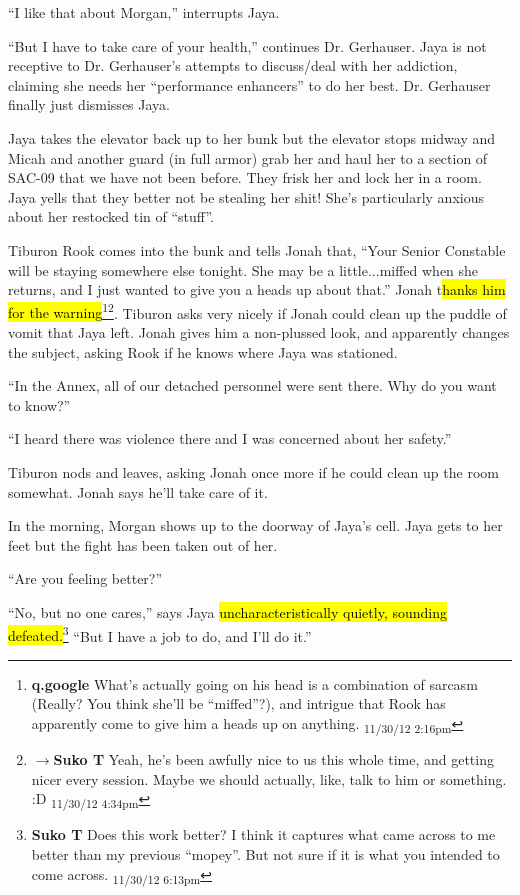 ``I like that about Morgan,'' interrupts Jaya.

``But I have to take care of your health,'' continues Dr. Gerhauser.  Jaya is not receptive to Dr. Gerhauser's attempts to discuss/deal with her addiction, claiming she needs her ``performance enhancers'' to do her best.  Dr. Gerhauser finally just dismisses Jaya. 



Jaya takes the elevator back up to her bunk but the elevator stops midway and Micah and another guard (in full armor) grab her and haul her to a section of SAC-09 that we have not been before. They frisk her and lock her in a room.  Jaya yells that they better not be stealing her shit!  She's particularly anxious about her restocked tin of ``stuff''.



Tiburon Rook comes into the bunk and tells Jonah that, ``Your Senior Constable will be staying somewhere else tonight.  She may be a little...miffed when she returns, and I just wanted to give you a heads up about that.'' Jonah t\hl{hanks him for the warning}\footnote{\textbf{q.google }What's actually going on his head is a combination of sarcasm (Really?  You think she'll be ``miffed''?), and intrigue that Rook has apparently come to give him a heads up on anything. \textsubscript{11/30/12 2:16pm}}\footnote{$\rightarrow$\textbf{Suko T }Yeah, he's been awfully nice to us this whole time, and getting nicer every session.  Maybe we should actually, like, talk to him or something. :D \textsubscript{11/30/12 4:34pm}}.  Tiburon asks very nicely if Jonah could clean up the puddle of vomit that Jaya left.  Jonah gives him a non-plussed look, and apparently changes the subject, asking Rook if he knows where Jaya was stationed.

``In the Annex, all of our detached personnel were sent there.  Why do you want to know?''

``I heard there was violence there and I was concerned about her safety.''

Tiburon nods and leaves, asking Jonah once more if he could clean up the room somewhat.  Jonah says he'll take care of it.



In the morning, Morgan shows up to the doorway of Jaya's cell.  Jaya gets to her feet but the fight has been taken out of her.

``Are you feeling better?''

``No, but no one cares,'' says Jaya \hl{uncharacteristically quietly, sounding defeated.}\footnote{\textbf{Suko T }Does this work better?  I think it captures what came across to me better than my previous ``mopey''.  But not sure if it is what you intended to come across. \textsubscript{11/30/12 6:13pm}} ``But I have a job to do, and I'll do it.''

